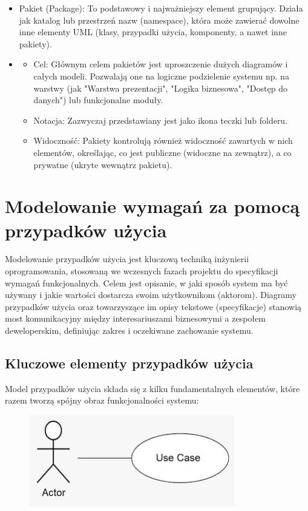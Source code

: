 \documentclass[a4paper,12pt]{article}
\begin{document}
\begin{itemize}
\item Pakiet (Package): To podstawowy i najważniejszy element grupujący. Działa jak katalog lub przestrzeń nazw (namespace), która może zawierać dowolne inne elementy UML (klasy, przypadki użycia, komponenty, a nawet inne pakiety).
\item \begin{itemize}
\item Cel: Głównym celem pakietów jest uproszczenie dużych diagramów i całych modeli. Pozwalają one na logiczne podzielenie systemu np. na warstwy (jak "Warstwa prezentacji", "Logika biznesowa", "Dostęp do danych") lub funkcjonalne moduły.
\item Notacja: Zazwyczaj przedstawiany jest jako ikona teczki lub folderu.
\item Widoczność: Pakiety kontrolują również widoczność zawartych w nich elementów, określając, co jest publiczne (widoczne na zewnątrz), a co prywatne (ukryte wewnątrz pakietu).
\end{itemize}
\end{itemize}

\section{Modelowanie wymagań za pomocą przypadków użycia}

Modelowanie przypadków użycia jest kluczową techniką inżynierii oprogramowania, stosowaną we wczesnych fazach projektu do specyfikacji wymagań funkcjonalnych. Celem jest opisanie, w jaki sposób system ma być używany i jakie wartości dostarcza swoim użytkownikom (aktorom). Diagramy przypadków użycia oraz towarzyszące im opisy tekstowe (specyfikacje) stanowią most komunikacyjny między interesariuszami biznesowymi a zespołem deweloperskim, definiując zakres i oczekiwane zachowanie systemu.

\subsection{Kluczowe elementy przypadków użycia}
Model przypadków użycia składa się z kilku fundamentalnych elementów, które razem tworzą spójny obraz funkcjonalności systemu:

\begin{figure}[h!]
    \centering
    \includegraphics[width=0.8\textwidth]{img/images.png}
\end{figure}
\end{document}
